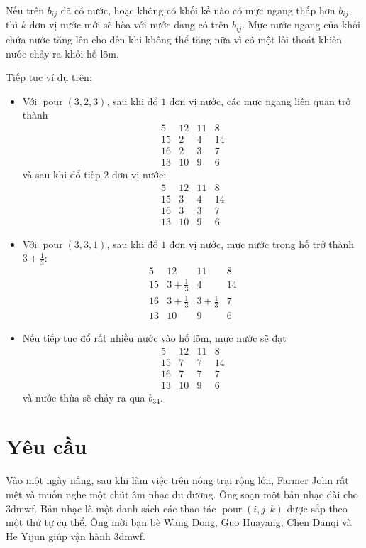 \documentclass[11pt]{article}
\begin{document}
Nếu trên \(b_{ij}\) đã có nước, hoặc không có khối kề nào có mực ngang thấp
hơn \(b_{ij}\), thì \(k\) đơn vị nước mới sẽ hòa với nước đang có trên
\(b_{ij}\). Mực nước ngang của khối chứa nước tăng lên cho đến khi không thể
tăng nữa vì có một lối thoát khiến nước chảy ra khỏi hố lõm.

Tiếp tục ví dụ trên:
\begin{itemize}
  \item Với \(\operatorname{pour}(3,2,3)\), sau khi đổ \(1\) đơn vị nước, các
  mực ngang liên quan trở thành
  \[
  \begin{array}{rrrr}
  5 & 12 & 11 & 8\\
  15 & 2 & 4 & 14\\
  16 & 2 & 3 & 7\\
  13 & 10 & 9 & 6
  \end{array}
  \]
  và sau khi đổ tiếp \(2\) đơn vị nước:
  \[
  \begin{array}{rrrr}
  5 & 12 & 11 & 8\\
  15 & 3 & 4 & 14\\
  16 & 3 & 3 & 7\\
  13 & 10 & 9 & 6
  \end{array}
  \]
  \item Với \(\operatorname{pour}(3,3,1)\), sau khi đổ \(1\) đơn vị nước,
  mực nước trong hố trở thành \(3+\frac13\):
  \[
  \begin{array}{rrrr}
  5 & 12 & 11 & 8\\
  15 & 3+\frac13 & 4 & 14\\
  16 & 3+\frac13 & 3+\frac13 & 7\\
  13 & 10 & 9 & 6
  \end{array}
  \]
  \item Nếu tiếp tục đổ rất nhiều nước vào hố lõm, mực nước sẽ đạt
  \[
  \begin{array}{rrrr}
  5 & 12 & 11 & 8\\
  15 & 7 & 7 & 14\\
  16 & 7 & 7 & 7\\
  13 & 10 & 9 & 6
  \end{array}
  \]
  và nước thừa sẽ chảy ra qua \(b_{34}\).
\end{itemize}

\section{Yêu cầu}

Vào một ngày nắng, sau khi làm việc trên nông trại rộng lớn, Farmer John rất
mệt và muốn nghe một chút âm nhạc du dương. Ông soạn một bản nhạc dài cho
3dmwf. Bản nhạc là một danh sách các thao tác \(\operatorname{pour}(i,j,k)\)
được sắp theo một thứ tự cụ thể. Ông mời bạn bè Wang Dong, Guo Huayang, Chen
Danqi và He Yijun giúp vận hành 3dmwf.
\end{document}

